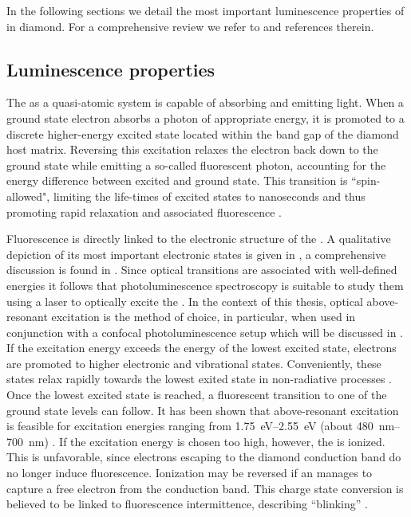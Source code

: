   In the following sections we detail the most important luminescence properties of \sivs in diamond. For a comprehensive review we refer to \cite{Riedrich-moller2014, Neu2012} and references therein.


  \subsection{Luminescence properties}

    The \sivc as a quasi-atomic system is capable of absorbing and emitting light. When a ground state electron absorbs a photon of appropriate energy, it is promoted to a discrete higher-energy excited state located within the band gap of the diamond host matrix. Reversing this excitation relaxes the electron back down to the ground state while emitting a so-called fluorescent photon, accounting for the energy difference between excited and ground state. This transition is ``spin-allowed", limiting the life-times of excited states to nanoseconds and thus promoting rapid relaxation and associated fluorescence \cite{Gali2013}.

    Fluorescence is directly linked to the electronic structure of the \siv. A qualitative depiction of its most important electronic states is given in , a comprehensive discussion is found in \cite{Gali2013, Hepp2014dissertation, Becker2014dissertation}.
    Since optical transitions are associated with well-defined energies it follows that photoluminescence spectroscopy is suitable to study them using a laser to optically excite the \siv. In the context of this thesis, optical above-resonant excitation is the method of choice, in particular, when used in conjunction with a confocal photoluminescence setup which will be discussed in .
    If the excitation energy exceeds the energy of the lowest excited state, electrons are promoted to higher electronic and vibrational states. Conveniently, these states relax rapidly towards the lowest exited state in non-radiative processes \cite{Gali2013}. Once the lowest excited state is reached, a fluorescent transition to one of the ground state levels can follow. It has been shown that above-resonant excitation is feasible for excitation energies ranging from \SIrange{1.75}{2.55}{\eV} (about \SIrange{480}{700}{\nm}) \cite{iakoubovskii2001optical, Iakoubovskii2000, Rossi1997}. If the excitation energy is chosen too high, however, the \siv is ionized. This is unfavorable, since electrons escaping to the diamond conduction band do no longer induce fluorescence. Ionization may be reversed if an \siv manages to capture a free electron from the conduction band. This charge state conversion is believed to be linked to fluorescence intermittence, describing ``blinking'' \sivs \cite{Muller2011, Siyushev2009}.

